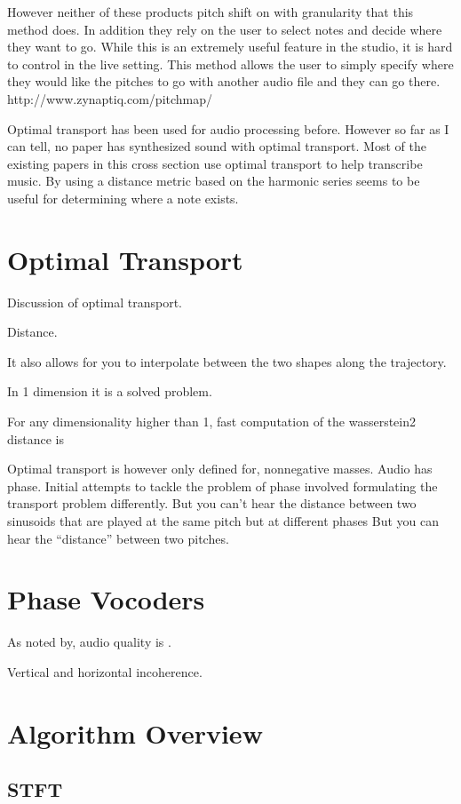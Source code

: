 \documentclass[12pt]{article}
\begin{document}
However neither of these products pitch shift on with granularity that this method does. In addition they rely on the user to select notes and decide where they want to go. While this is an extremely useful feature in the studio, it is hard to control in the live setting. This method allows the user to simply specify where they would like the pitches to go with another audio file and they can go there. 
http://www.zynaptiq.com/pitchmap/

Optimal transport has been used for audio processing before.
However so far as I can tell, no paper has synthesized sound with optimal transport.
Most of the existing papers in this cross section use optimal transport to help transcribe music.
By using a distance metric based on the harmonic series seems to be useful for determining where a note exists.

\section{Optimal Transport}

Discussion of optimal transport.

Distance. 

It also allows for you to interpolate between the two shapes along the trajectory.

In 1 dimension it is a solved problem.

For any dimensionality higher than 1, fast computation of the wasserstein2 distance is 

Optimal transport is however only defined for, nonnegative masses.
Audio has phase.
Initial attempts to tackle the problem of phase involved formulating the transport problem differently.
But you can't hear the distance between two sinusoids that are played at the same pitch but at different phases
But you can hear the ``distance'' between two pitches.

\section{Phase Vocoders}
As noted by, 
audio quality is .

Vertical and horizontal incoherence.


\section{Algorithm Overview}

\subsection{STFT}
\end{document}
